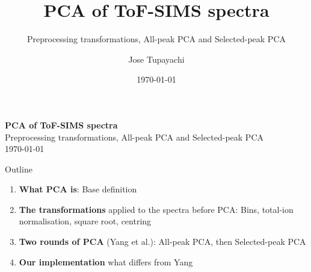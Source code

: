 \documentclass[aspectratio=169,10pt]{beamer}
\title{PCA of ToF-SIMS spectra}
\subtitle{Preprocessing transformations, All-peak PCA and Selected-peak PCA}
\author{Jose Tupayachi}
\date{\today}
\newcommand{\hl}[1]{{\color{warm}\bfseries #1}}
\begin{document}
\begin{frame}[plain]
  \vspace{8mm}
  \begin{center}
    {\color{navy}\Large\bfseries PCA of ToF-SIMS spectra}\\[2mm]
    {\color{teal}\large Preprocessing transformations, All-peak PCA and Selected-peak PCA}\\[7mm]
    {\color{muted}\small \today}
    \vfill
  \end{center}
\end{frame}

\begin{frame}{Outline}
  \begin{enumerate}
    \setlength\itemsep{3mm}
    \item \hl{What PCA is}: Base definition
    \item \hl{The transformations} applied to the spectra before PCA: Bins, total-ion normalisation, square root, centring
    \item \hl{Two rounds of PCA} (Yang et al.): All-peak PCA, then Selected-peak PCA
    \item \hl{Our implementation} what differs from Yang
  \end{enumerate}
\end{frame}
\end{document}
